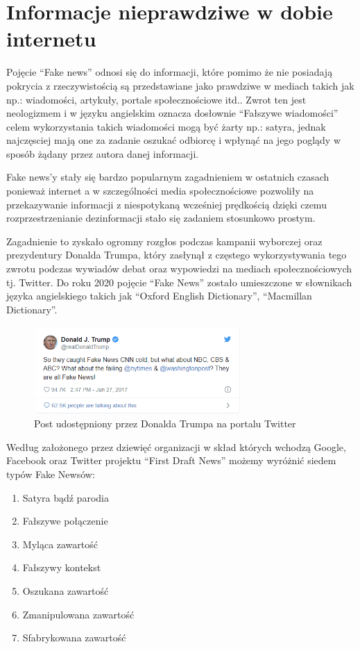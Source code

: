 \chapter{Informacje nieprawdziwe w dobie internetu}
Pojęcie ``Fake news'' odnosi się do 
informacji, które pomimo że nie posiadają pokrycia z rzeczywistością są 
przedstawiane jako prawdziwe w mediach takich jak np.: wiadomości, artykuły, 
portale społecznościowe itd.. 
Zwrot ten jest neologizmem i w języku angielskim oznacza dosłownie ``Fałszywe wiadomości''
celem wykorzystania takich wiadomości mogą być żarty np.: satyra, jednak najczęsciej 
mają one za zadanie oszukać odbiorcę i wpłynąć na jego poglądy w sposób żądany przez autora
danej informacji. 

Fake news'y stały się bardzo popularnym zagadnieniem w ostatnich czasach ponieważ
internet a w szczególności media społecznościowe pozwoliły na przekazywanie 
informacji z niespotykaną wcześniej prędkością dzięki czemu rozprzestrzenianie 
dezinformacji stało się zadaniem stosunkowo prostym.

Zagadnienie to zyskało ogromny rozgłos podczas kampanii wyborczej oraz
prezydentury Donalda Trumpa, który zasłynął z częstego wykorzystywania 
tego zwrotu podczas wywiadów debat oraz wypowiedzi na mediach społecznościowych
tj. Twitter.
Do roku 2020 pojęcie ``Fake News'' zostało umieszczone w słownikach języka angielskiego
takich jak ``Oxford English Dictionary'', ``Macmillan Dictionary''.
\begin{figure}[h!]
    \centering
    \includegraphics[width=0.7\textwidth]{./Img/Trump-Fake-News.png}
    \caption{Post udostępniony przez Donalda Trumpa na portalu Twitter}
\end{figure}

Według założonego przez dziewięć organizacji w skład których wchodzą 
Google, Facebook oraz Twitter projektu ``First Draft News''
możemy wyróżnić siedem typów Fake Newsów:
\begin{enumerate}
    \item Satyra bądź parodia
    \item Fałszywe połączenie
    \item Myląca zawartość
    \item Fałszywy kontekst
    \item Oszukana zawartość
    \item Zmanipulowana zawartość
    \item Sfabrykowana zawartość
\end{enumerate}


